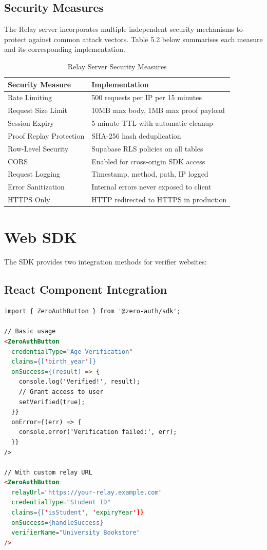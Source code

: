 \subsection{Security Measures}

The Relay server incorporates multiple independent security mechanisms to protect against common attack vectors. Table 5.2 below summarises each measure and its corresponding implementation.

\begin{table}[H]
\centering
\caption{Relay Server Security Measures}
\begin{tabular}{|l|p{7cm}|}
\hline
\textbf{Security Measure} & \textbf{Implementation} \\
\hline
Rate Limiting & 500 requests per IP per 15 minutes \\
Request Size Limit & 10MB max body, 1MB max proof payload \\
Session Expiry & 5-minute TTL with automatic cleanup \\
Proof Replay Protection & SHA-256 hash deduplication \\
Row-Level Security & Supabase RLS policies on all tables \\
CORS & Enabled for cross-origin SDK access \\
Request Logging & Timestamp, method, path, IP logged \\
Error Sanitization & Internal errors never exposed to client \\
HTTPS Only & HTTP redirected to HTTPS in production \\
\hline
\end{tabular}
\end{table}

\section{Web SDK}

The SDK provides two integration methods for verifier websites:

\subsection{React Component Integration}
\begin{lstlisting}[language=HTML, caption={React Integration}]
import { ZeroAuthButton } from '@zero-auth/sdk';

// Basic usage
<ZeroAuthButton 
  credentialType="Age Verification"
  claims={['birth_year']}
  onSuccess={(result) => {
    console.log('Verified!', result);
    // Grant access to user
    setVerified(true);
  }}
  onError={(err) => {
    console.error('Verification failed:', err);
  }}
/>

// With custom relay URL
<ZeroAuthButton 
  relayUrl="https://your-relay.example.com"
  credentialType="Student ID"
  claims={['isStudent', 'expiryYear']}
  onSuccess={handleSuccess}
  verifierName="University Bookstore"
/>
\end{lstlisting}

